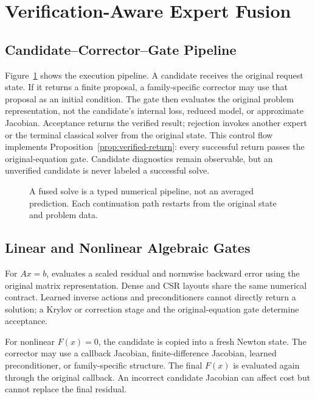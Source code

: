 \section{Verification-Aware Expert Fusion}
\label{sec:fusion}

\subsection{Candidate--Corrector--Gate Pipeline}

Figure~\ref{fig:fusion} shows the execution pipeline. A candidate receives the
original request state. If it returns a finite proposal,
a family-specific corrector may use that proposal as an initial condition. The gate
then evaluates the original problem representation, not the candidate's internal
loss, reduced model, or approximate Jacobian. Acceptance returns the verified result;
rejection invokes another expert or the terminal classical solver from the original state.
This control flow implements Proposition~\ref{prop:verified-return}: every
successful return passes the original-equation gate. Candidate diagnostics remain
observable, but an unverified candidate is never labeled a successful solve.

\begin{figure}[t]
\centering
\resizebox{\columnwidth}{!}{}
\caption{A fused solve is a typed numerical pipeline, not an averaged prediction.
Each continuation path restarts from the original state and problem data.}
\label{fig:fusion}
\end{figure}

\subsection{Linear and Nonlinear Algebraic Gates}

For $Ax=b$, \system evaluates a scaled residual and normwise backward error using
the original matrix representation. Dense and CSR layouts share the same numerical
contract. Learned inverse actions and preconditioners cannot directly return a
solution; a Krylov or correction stage and the original-equation gate determine acceptance.

For nonlinear $F(x)=0$, the candidate is copied into a fresh Newton state. The
corrector may use a callback Jacobian, finite-difference Jacobian, learned
preconditioner, or family-specific structure. The final $F(x)$ is evaluated again
through the original callback. An incorrect candidate Jacobian can affect cost but
cannot replace the final residual.

